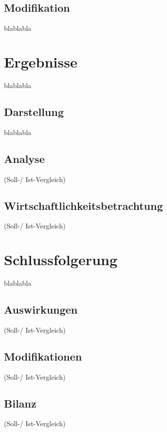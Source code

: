 \subsection{Modifikation}
\label{subsec:description:modifikation}
blablabla

\section{Ergebnisse}
\label{sec:description:ergebnisse}
blablabla

\subsection{Darstellung}
\label{subsec:description:darstellung}
blablabla

\subsection{Analyse}
\label{subsec:description:analyse}
(Soll-/ Ist-Vergleich)

\subsection{Wirtschaftlichkeitsbetrachtung}
\label{subsec:description:ergebnisse:wirtschaftlichkeitsbetrachtung}
(Soll-/ Ist-Vergleich)

\section{Schlussfolgerung}
\label{sec:description:schlussfolgerung}
blablabla

\subsection{Auswirkungen}
\label{subsec:description:auswirkungen}
(Soll-/ Ist-Vergleich)

\subsection{Modifikationen}
\label{subsec:description:modifikationen}
(Soll-/ Ist-Vergleich)

\subsection{Bilanz}
\label{subsec:description:bilanz}
(Soll-/ Ist-Vergleich)
